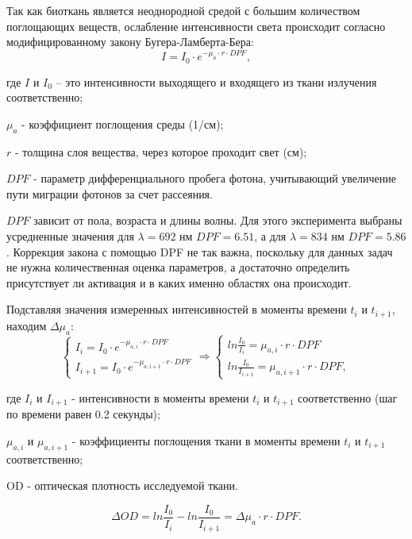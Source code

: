 Так как биоткань является неоднородной средой с большим количеством поглощающих веществ, ослабление интенсивности света происходит согласно модифицированному закону Бугера-Ламберта-Бера:
\begin{equation}\label{blb}
I=I_0\cdot e^{-\mu_a \cdot r \cdot DPF},
\end{equation}

где $I$ и $I_0$ -- 
это интенсивности выходящего и входящего из ткани излучения соответственно;

$\mu_a$ - коэффициент поглощения среды (1/см);

$r$ - толщина слоя вещества, через которое проходит свет (см);

$DPF$ - параметр дифференциального пробега фотона, учитывающий увеличение пути миграции фотонов за счет рассеяния.

$DPF$ зависит от пола, возраста и длины волны. Для этого эксперимента выбраны усредненные значения для $\lambda= 692$ нм $DPF = 6.51$, а для $\lambda= 834$ нм $DPF = 5.86$.
Коррекция закона с помощью DPF не так важна, поскольку для данных задач не нужна количественная оценка параметров, а достаточно определить присутствует ли активация и в каких именно областях она происходит.

Подставляя значения измеренных интенсивностей в моменты времени $t_i$ и $t_{i+1}$, находим $\Delta \mu_a$:
\begin{equation}\label{blb}
\begin{cases}
   {I_i=I_0 \cdot e^{-\mu_{a,i}\cdot r \cdot DPF}}\\
   {I_{i+1}=I_0\cdot e^{-\mu_{a,{i+1}}\cdot r \cdot DPF}}
 \end{cases}
 \Rightarrow
 \begin{cases}
   {ln{\frac{I_0}{I_i}}=\mu_{a,i} \cdot r \cdot DPF}\\
   {ln{\frac{I_0}{I_{i+1}}}=\mu_{a,{i+1}} \cdot r \cdot DPF},
 \end{cases}
\end{equation}
\vspace{-5mm}

где $I_i$ и $I_{i+1}$ - интенсивности в моменты времени $t_i$ и $t_{i+1}$ соответственно (шаг по времени равен 0.2 секунды); 

$\mu_{a,i}$ и $\mu_{a,{i+1}}$ - коэффициенты поглощения ткани в моменты времени $t_i$ и $t_{i+1}$ соответственно; 

OD - оптическая плотность исследуемой ткани.

\begin{equation}\label{blb}
\Delta OD=ln{\frac{I_0}{I_i}}-ln{\frac{I_0}{I_{i+1}}}=\Delta \mu_a \cdot r \cdot DPF.
\end{equation}

